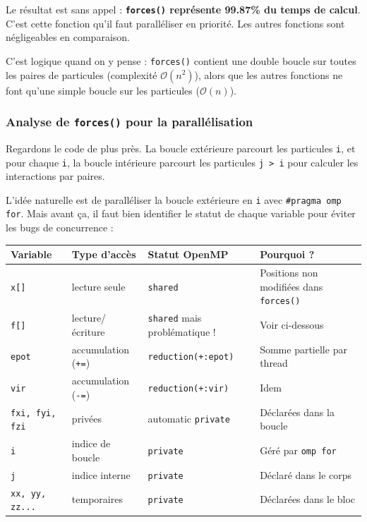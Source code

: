 \documentclass[12pt,a4paper]{article}
\begin{document}
Le résultat est sans appel : \textbf{\textcolor{warnborder}{\texttt{forces()} représente 99.87\% du temps de calcul}}. C'est cette fonction qu'il faut paralléliser en priorité. Les autres fonctions sont négligeables en comparaison.

C'est logique quand on y pense : \texttt{forces()} contient une double boucle sur toutes les paires de particules (complexité $\mathcal{O}(n^2)$), alors que les autres fonctions ne font qu'une simple boucle sur les particules ($\mathcal{O}(n)$).

\subsubsection{Analyse de \texttt{forces()} pour la parallélisation}

Regardons le code de plus près. La boucle extérieure parcourt les particules \texttt{i}, et pour chaque \texttt{i}, la boucle intérieure parcourt les particules \texttt{j > i} pour calculer les interactions par paires.

L'idée naturelle est de paralléliser la boucle extérieure en \texttt{i} avec \texttt{\#pragma omp for}. Mais avant ça, il faut bien identifier le statut de chaque variable pour éviter les bugs de concurrence :

\begin{center}
\begin{tabular}{llll}
\toprule
\textbf{\color{mainblue}Variable} & \textbf{\color{mainblue}Type d'accès} & \textbf{\color{mainblue}Statut OpenMP} & \textbf{\color{mainblue}Pourquoi ?} \\
\midrule
\texttt{x[]} & lecture seule & \texttt{shared} & Positions non modifiées dans \texttt{forces()} \\
\texttt{f[]} & lecture/écriture & \texttt{shared} mais problématique ! & Voir ci-dessous \\
\texttt{epot} & accumulation (\texttt{+=}) & \texttt{reduction(+:epot)} & Somme partielle par thread \\
\texttt{vir} & accumulation (\texttt{-=}) & \texttt{reduction(+:vir)} & Idem \\
\texttt{fxi, fyi, fzi} & privées & automatic \texttt{private} & Déclarées dans la boucle \\
\texttt{i} & indice de boucle & \texttt{private} & Géré par \texttt{omp for} \\
\texttt{j} & indice interne & \texttt{private} & Déclaré dans le corps \\
\texttt{xx, yy, zz...} & temporaires & \texttt{private} & Déclarées dans le bloc \\
\bottomrule
\end{tabular}
\end{center}
\end{document}
